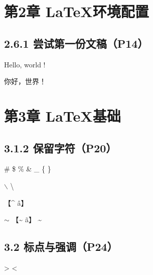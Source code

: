 \documentclass{ctexart}
\begin{document}
\section*{第2章 \LaTeX 环境配置}
	\subsection*{2.6.1 尝试第一份文稿（P14）}
		Hello, world ! 

		你好，世界！ 

\section*{第3章 \LaTeX 基础}
	\subsection*{3.1.2 保留字符（P20）}
		\# 
		\$ 
		\% 
		\& 
		\_ 
		\{ 
		\} 

		$\backslash$ 
		\textbackslash 
		\texttt{} 
		{\ttfamily {}} 

		【\^{} \^a】

		$\sim$
		【\~{} \~a】
		\textasciitilde

	\subsection*{3.2 标点与强调（P24）}
		> < 
		
\end{document}
